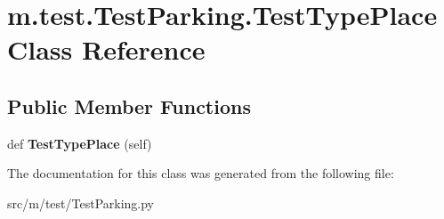 \hypertarget{classm_1_1test_1_1_test_parking_1_1_test_type_place}{}\section{m.\+test.\+Test\+Parking.\+Test\+Type\+Place Class Reference}
\label{classm_1_1test_1_1_test_parking_1_1_test_type_place}
\subsection*{Public Member Functions}
\begin{DoxyCompactItemize}
\item 
\hypertarget{classm_1_1test_1_1_test_parking_1_1_test_type_place_accc08cb873dae06e65b63ffe2e9b8475}{}def {\bfseries Test\+Type\+Place} (self)\label{classm_1_1test_1_1_test_parking_1_1_test_type_place_accc08cb873dae06e65b63ffe2e9b8475}

\end{DoxyCompactItemize}


The documentation for this class was generated from the following file\+:\begin{DoxyCompactItemize}
\item 
src/m/test/Test\+Parking.\+py\end{DoxyCompactItemize}
